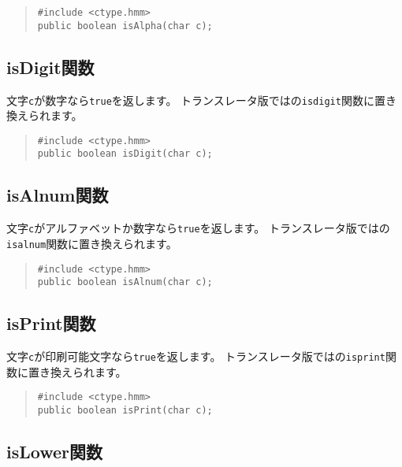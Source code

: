 \begin{quote}
\begin{verbatim}
#include <ctype.hmm>
public boolean isAlpha(char c);
\end{verbatim}
\end{quote}

\subsection{isDigit関数}

文字\verb/c/が数字なら\verb/true/を返します。
トランスレータ版では\cl の\verb/isdigit/関数に置き換えられます。

\begin{quote}
\begin{verbatim}
#include <ctype.hmm>
public boolean isDigit(char c);
\end{verbatim}
\end{quote}

\subsection{isAlnum関数}

文字\verb/c/がアルファベットか数字なら\verb/true/を返します。
トランスレータ版では\cl の\verb/isalnum/関数に置き換えられます。

\begin{quote}
\begin{verbatim}
#include <ctype.hmm>
public boolean isAlnum(char c);
\end{verbatim}
\end{quote}

\subsection{isPrint関数}

文字\verb/c/が印刷可能文字なら\verb/true/を返します。
トランスレータ版では\cl の\verb/isprint/関数に置き換えられます。

\begin{quote}
\begin{verbatim}
#include <ctype.hmm>
public boolean isPrint(char c);
\end{verbatim}
\end{quote}

\subsection{isLower関数}

